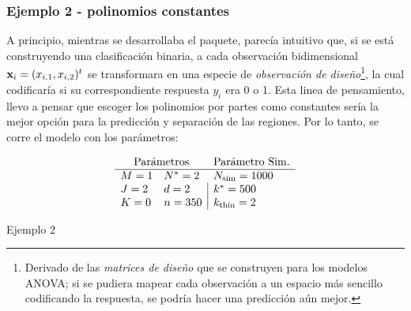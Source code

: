 \documentclass[../Main/Main.tex]{subfiles}
\begin{document}
\subsubsection*{Ejemplo 2 - polinomios constantes}
A principio, mientras se desarrollaba el paquete, parecía intuitivo
que, si se está construyendo una clasificación binaria, a cada observación bidimensional $\mathbf{x}_i = (x_{i,1}, x_{i,2})^t$ se transformara en una especie de \textit{observación de diseño}\footnote{Derivado de las \textit{matrices de diseño} que se construyen para los modelos ANOVA; si se pudiera mapear cada observación a un espacio más sencillo codificando la respuesta, se podría hacer una predicción aún mejor.}, la cual codificaría si su correspondiente respuesta $y_i$ era 0 o 1. Esta linea de pensamiento, llevo a pensar que escoger los polinomios por partes como constantes sería la mejor opción para la predicción y separación de las regiones. Por lo tanto, se corre el modelo con los parámetros:
\begin{table}[H]
$$\paramsmod{1}{2}{0}{2}{2}{350}{1000}{500}{2}$$
\caption*{Ejemplo 2}
\label{ej:2}
\end{table}
\end{document}
